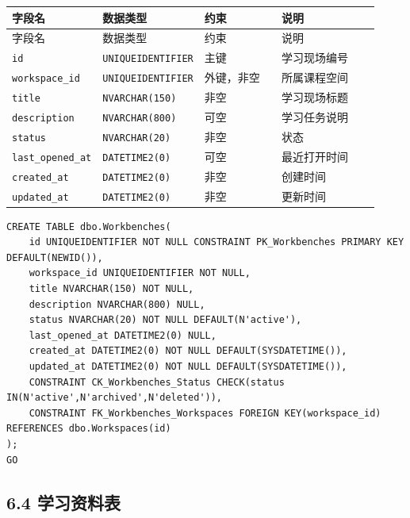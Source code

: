 \documentclass[10pt,a4paper,fontset=none]{ctexart}
\begin{document}
\begingroup\scriptsize
\renewcommand{\arraystretch}{1.18}
\setlength{\LTleft}{0pt}
\setlength{\LTright}{0pt}
\begin{longtable}{>{\raggedright\arraybackslash}p{0.20\linewidth}>{\raggedright\arraybackslash}p{0.16\linewidth}>{\raggedright\arraybackslash}p{0.24\linewidth}>{\raggedright\arraybackslash}p{0.32\linewidth}}
\toprule
字段名 & 数据类型 & 约束 & 说明 \\
\midrule
\endfirsthead
\toprule
字段名 & 数据类型 & 约束 & 说明 \\
\midrule
\endhead
\texttt{id} & \texttt{UNIQUEIDENTIFIER} & 主键 & 学习现场编号 \\
\texttt{workspace\_id} & \texttt{UNIQUEIDENTIFIER} & 外键，非空 & 所属课程空间 \\
\texttt{title} & \texttt{NVARCHAR(150)} & 非空 & 学习现场标题 \\
\texttt{description} & \texttt{NVARCHAR(800)} & 可空 & 学习任务说明 \\
\texttt{status} & \texttt{NVARCHAR(20)} & 非空 & 状态 \\
\texttt{last\_opened\_at} & \texttt{DATETIME2(0)} & 可空 & 最近打开时间 \\
\texttt{created\_at} & \texttt{DATETIME2(0)} & 非空 & 创建时间 \\
\texttt{updated\_at} & \texttt{DATETIME2(0)} & 非空 & 更新时间 \\
\bottomrule
\end{longtable}
\endgroup


\begin{Verbatim}[fontsize=\scriptsize,frame=single]
CREATE TABLE dbo.Workbenches(
    id UNIQUEIDENTIFIER NOT NULL CONSTRAINT PK_Workbenches PRIMARY KEY DEFAULT(NEWID()),
    workspace_id UNIQUEIDENTIFIER NOT NULL,
    title NVARCHAR(150) NOT NULL,
    description NVARCHAR(800) NULL,
    status NVARCHAR(20) NOT NULL DEFAULT(N'active'),
    last_opened_at DATETIME2(0) NULL,
    created_at DATETIME2(0) NOT NULL DEFAULT(SYSDATETIME()),
    updated_at DATETIME2(0) NOT NULL DEFAULT(SYSDATETIME()),
    CONSTRAINT CK_Workbenches_Status CHECK(status IN(N'active',N'archived',N'deleted')),
    CONSTRAINT FK_Workbenches_Workspaces FOREIGN KEY(workspace_id) REFERENCES dbo.Workspaces(id)
);
GO
\end{Verbatim}

\subsection*{6.4 学习资料表}
\end{document}
